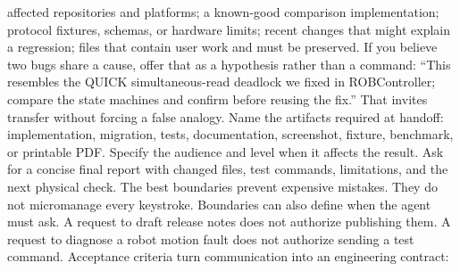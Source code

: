 \markdownRendererUlItem affected repositories and platforms;\markdownRendererUlItemEnd 
\markdownRendererUlItem a known-good comparison implementation;\markdownRendererUlItemEnd 
\markdownRendererUlItem protocol fixtures, schemas, or hardware limits;\markdownRendererUlItemEnd 
\markdownRendererUlItem recent changes that might explain a regression;\markdownRendererUlItemEnd 
\markdownRendererUlItem files that contain user work and must be preserved.\markdownRendererUlItemEnd 
\markdownRendererUlEnd \markdownRendererInterblockSeparator
{}If you believe two bugs share a cause, offer that as a hypothesis rather than a\markdownRendererSoftLineBreak
{}command: “This resembles the QUICK simultaneous-read deadlock we fixed in\markdownRendererSoftLineBreak
{}ROBController; compare the state machines and confirm before reusing the fix.”\markdownRendererSoftLineBreak
{}That invites transfer without forcing a false analogy.\markdownRendererInterblockSeparator
{}
\markdownRendererSectionEnd \markdownRendererSectionBegin
{}\markdownRendererInterblockSeparator
{}Name the artifacts required at handoff: implementation, migration, tests,\markdownRendererSoftLineBreak
{}documentation, screenshot, fixture, benchmark, or printable PDF. Specify the\markdownRendererSoftLineBreak
{}audience and level when it affects the result. Ask for a concise final report\markdownRendererSoftLineBreak
{}with changed files, test commands, limitations, and the next physical check.\markdownRendererInterblockSeparator
{}
\markdownRendererSectionEnd \markdownRendererSectionBegin
{}\markdownRendererInterblockSeparator
{}The best boundaries prevent expensive mistakes. They do not micromanage every\markdownRendererSoftLineBreak
{}keystroke.\markdownRendererInterblockSeparator
{}\markdownRendererInterblockSeparator
{}Boundaries can also define when the agent must ask. A request to draft release\markdownRendererSoftLineBreak
{}notes does not authorize publishing them. A request to diagnose a robot motion\markdownRendererSoftLineBreak
{}fault does not authorize sending a test command.\markdownRendererInterblockSeparator
{}
\markdownRendererSectionEnd \markdownRendererSectionBegin
{}\markdownRendererInterblockSeparator
{}Acceptance criteria turn communication into an engineering contract:\markdownRendererInterblockSeparator
